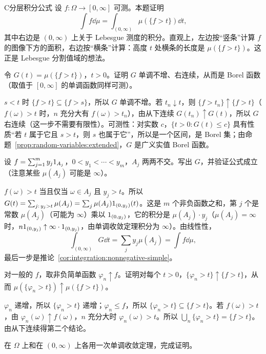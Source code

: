 \begin{probleme}{C}{分层积分公式}
设 $f:\Omega\to[0,\infty]$ 可测。本题证明
\[
\int f\dd\mu=\int_{(0,\infty)}\mu(\{f>t\})\dd t,
\]
其中右边是 $(0,\infty)$ 上关于 Lebesgue 测度的积分。直观上，左边按“竖条”计算 $f$ 的图像下方的面积，右边按“横条”计算：高度 $t$ 处横条的长度是 $\mu(\{f>t\})$。这正是 Lebesgue 分割值域的想法。
\begin{questions}
\item 令 $G(t)=\mu(\{f>t\})$，$t>0$。证明 $G$ 单调不增、右连续，从而是 Borel 函数（取值于 $[0,\infty]$ 的单调函数同样可测）。
\begin{solution}
$s<t$ 时 $\{f>t\}\subseteq\{f>s\}$，所以 $G$ 单调不增。若 $t_n\downarrow t$，则 $\{f>t_n\}\uparrow\{f>t\}$（$f(\omega)>t$ 时，$n$ 充分大有 $f(\omega)>t_n$），由从下连续 $G(t_n)\uparrow G(t)$，所以 $G$ 右连续（这一步不需要有限性）。可测性：对实数 $c$，$\{t>0:G(t)\leqslant c\}$ 具有性质“若 $t$ 属于它且 $s>t$，则 $s$ 也属于它”，所以是一个区间，是 Borel 集；由命题~\ref{prop:random-variables:extended}，$G$ 是广义实值 Borel 函数。
\end{solution}
\item 设 $f=\sum_{j=1}^my_j1_{A_j}$，$0<y_1<\cdots<y_m$，$A_j$ 两两不交。写出 $G$，并验证公式成立（注意某些 $\mu(A_j)$ 可能是 $\infty$）。
\begin{solution}
$f(\omega)>t$ 当且仅当 $\omega\in A_j$ 且 $y_j>t$。所以 $G(t)=\sum_{j:\,y_j>t}\mu(A_j)=\sum_j\mu(A_j)1_{(0,y_j)}(t)$。这是 $m$ 个非负函数之和，第 $j$ 个是常数 $\mu(A_j)$（可能为 $\infty$）乘以 $1_{(0,y_j)}$，它的积分是 $\mu(A_j)\cdot y_j$（$\mu(A_j)=\infty$ 时，$n1_{(0,y_j)}\uparrow\infty\cdot1_{(0,y_j)}$，由单调收敛定理积分为 $\infty$）。由线性性，
\[
\int_{(0,\infty)}G\dd t=\sum_jy_j\mu(A_j)=\int f\dd\mu,
\]
最后一步是推论~\ref{cor:integration:nonnegative-simple}。
\end{solution}
\item 对一般的 $f$，取非负简单函数 $\varphi_n\uparrow f$。证明对每个 $t>0$，$\{\varphi_n>t\}\uparrow\{f>t\}$，从而 $\mu(\{\varphi_n>t\})\uparrow\mu(\{f>t\})$。
\begin{solution}
$\varphi_n$ 递增，所以 $\{\varphi_n>t\}$ 递增；$\varphi_n\leqslant f$，所以 $\{\varphi_n>t\}\subseteq\{f>t\}$。若 $f(\omega)>t$，由 $\varphi_n(\omega)\uparrow f(\omega)$，$n$ 充分大时 $\varphi_n(\omega)>t$。所以 $\bigcup_n\{\varphi_n>t\}=\{f>t\}$。由从下连续得第二个结论。
\end{solution}
\item 在 $\Omega$ 上和在 $(0,\infty)$ 上各用一次单调收敛定理，完成证明。

\end{questions}
\end{probleme}
